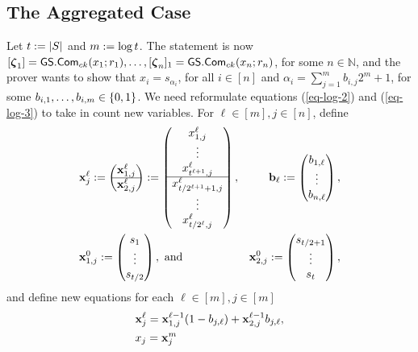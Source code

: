 \subsection{The Aggregated Case}
Let $t:=|S|$ and \(m:=\log t \). The statement is now \([{\boldsymbol \zeta}_1]={\mathsf{GS}}.\mathsf{Com}_{ck}(x_1;r_1),\ldots,\allowbreak[{\boldsymbol \zeta}_n]_1={\mathsf{GS}}.\mathsf{Com}_{ck}(x_n;r_n)\), for some $n\in\mathbb{N}$, and the prover wants to show that \(x_i=s_{\alpha_i}\), for all \(i\in[n]\) and \(\alpha_i=\sum_{j=1}^m b_{i,j}2^m+1\), for some $b_{i,1},\ldots,b_{i,m}\in\{0,1\}$. We need reformulate equations (\ref{eq-log-2}) and (\ref{eq-log-3}) to take in count new variables. For \(\ell\in [m],j\in[n]\), define
\begin{align*}
&\mathbf{x}_j^\ell:=
\begin{pmatrix}
\mathbf{x}^\ell_{1,j}\\
\hline
\mathbf{x}^\ell_{2,j}
\end{pmatrix}
:=
\begin{pmatrix}
x^\ell_{1,j}\\\vdots\\x^\ell_{t ^{\ell+1},j}\\
\hline
x^\ell_{t /2^{\ell+1}+1,j}\\\vdots\\x^\ell_{t /2^\ell,j}
\end{pmatrix},
&\mathbf{b}_\ell := 
\begin{pmatrix}
b_{1,\ell}\\\vdots\\b_{n,\ell}
\end{pmatrix},\\
&\mathbf{x}_{1,j}^0 := \begin{pmatrix}
s_1\\\vdots\\s_{t /2}
\end{pmatrix},\text{ and }
&\mathbf{x}_{2,j}^0 := \begin{pmatrix}
s_{t /2+1}\\\vdots\\s_{t }
\end{pmatrix},
\end{align*}
and define new equations for each $\ell\in[m],j\in[m]$
\begin{align}
&\mathbf{x}^\ell_j=\mathbf{x}^{\ell-1}_{1,j}({1}-{b}_{j,\ell})+\mathbf{x}^{\ell-1}_{2,j}{b}_{j,\ell},\label{eq-alog-1}\\
&x_j= \mathbf{x}_{j}^m\label{eq-alog-1}
\end{align}


